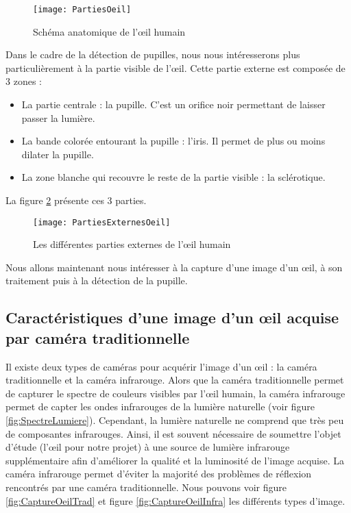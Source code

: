 \begin{figure}[H]
  \centering
  \texttt{[image: PartiesOeil]}
  \caption{Schéma anatomique de l'œil humain}
  \label{fig:PartiesOeil}
\end{figure}

Dans le cadre de la détection de pupilles, nous nous intéresserons plus particulièrement à la partie visible de l’œil. Cette partie externe est composée de 3 zones :
\begin{itemize}[label=\textbullet,font=\color{black}]
\item La partie centrale : la pupille. C’est un orifice noir permettant de laisser passer la lumière.
\item La bande colorée entourant la pupille : l’iris. Il permet de plus ou moins dilater la pupille.
\item La zone blanche qui recouvre le reste de la partie visible : la sclérotique.
\end{itemize}

La figure \ref{fig:PartiesExternesOeil} présente ces 3 parties.
\begin{figure}[h]
  \centering
  \texttt{[image: PartiesExternesOeil]}
  \caption{Les différentes parties externes de l'œil humain}
  \label{fig:PartiesExternesOeil}
\end{figure}

Nous allons maintenant nous intéresser à la capture d’une image d’un œil, à son traitement puis à la détection de la pupille.

\subsection{Caractéristiques d’une image d’un œil acquise par caméra traditionnelle}

Il existe deux types de caméras pour acquérir l'image d’un œil : la caméra traditionnelle et la caméra infrarouge. Alors que la caméra traditionnelle permet de capturer le spectre de couleurs visibles par l’œil humain, la caméra infrarouge permet de capter les ondes infrarouges de la lumière naturelle (voir figure \ref{fig:SpectreLumiere}). Cependant, la lumière naturelle ne comprend que très peu de composantes infrarouges. Ainsi, il est souvent nécessaire de soumettre l’objet d’étude (l’œil pour notre projet) à une source de lumière infrarouge supplémentaire afin d’améliorer la qualité et la luminosité de l’image acquise. La caméra infrarouge permet d’éviter la majorité des problèmes de réflexion rencontrés par une caméra traditionnelle. Nous pouvons voir figure \ref{fig:CaptureOeilTrad} et figure \ref{fig:CaptureOeilInfra} les différents types d’image.

